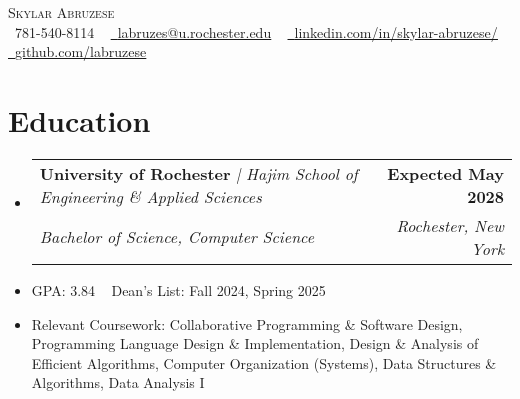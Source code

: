 \documentclass[letterpaper,11pt]{article}
\makeatletter
\newcommand{\resumeItem}[1]{
  \item\small{
    \begin{minipage}[t]{\dimexpr\linewidth-0.2in}
      {#1 \vspace{-2pt}}
    \end{minipage}
  }
}
\newcommand{\resumeEducationSubheading}[5]{
  \vspace{-2pt}\item
    \begin{tabular*}{1.0\textwidth}[t]{l@{\extracolsep{\fill}}r}
      \textbf{#1} \textit{| #2} & \textbf{\small #3} \\
      \textit{\small#4} & \textit{\small #5} \\
    \end{tabular*}\vspace{-7pt}
}
\newcommand{\resumeSubHeadingListStart}{\begin{itemize}[leftmargin=0.0in, label={}]}
\newcommand{\resumeSubHeadingListEnd}{\end{itemize}}
\makeatother
\begin{document}
\begin{center}
    {\Huge \scshape Skylar Abruzese} \\ \vspace{1pt}
    \small \raisebox{-0.1\height}\faPhone\ 781-540-8114 ~
    \href{mailto:labruzes@u.rochester.edu}{\raisebox{-0.2\height}\faEnvelope\ \underline{labruzes@u.rochester.edu}}  ~ 
    \href{https://linkedin.com/in/skylar-abruzese/}{\raisebox{-0.2\height}\faLinkedin\ \underline{linkedin.com/in/skylar-abruzese/}}  ~
    \href{https://github.com/labruzese}{\raisebox{-0.2\height}\faGithub\ \underline{github.com/labruzese}}
    \vspace{-8pt}
\end{center}


\section{Education}
  \resumeSubHeadingListStart
    \resumeEducationSubheading
      {University of Rochester}{Hajim School of Engineering \& Applied Sciences}{Expected May 2028}
      {Bachelor of Science, Computer Science}{Rochester, New York}
      \resumeItem{{\selectfont GPA}: 3.84 ~ Dean's List: Fall 2024, Spring 2025}
      \vspace{-6pt}
      \resumeItem{{\selectfont Relevant Coursework}: Collaborative Programming \& Software Design,  Programming Language Design \& Implementation, Design \& Analysis of Efficient Algorithms, Computer Organization (Systems), Data Structures \& Algorithms, Data Analysis I
                  }
        \vspace{-6pt}
\resumeSubHeadingListEnd
\end{document}
